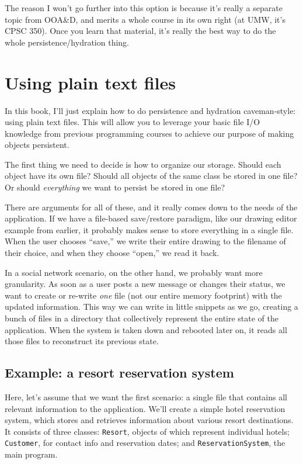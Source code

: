 The reason I won't go further into this option is because it's really a
separate topic from OOA\&D, and merits a whole course in its own right (at
UMW, it's CPSC 350). Once you learn that material, it's really the best way to
do the whole persistence/hydration thing.

\section{Using plain text files}

In this book, I'll just explain how to do persistence and hydration
caveman-style: using plain text files. This will allow you to leverage your
basic file I/O knowledge from previous programming courses to achieve our
purpose of making objects persistent.

The first thing we need to decide is how to organize our storage. Should each
object have its own file? Should all objects of the same class be stored in
one file? Or should \textit{everything} we want to persist be stored in one
file?

There are arguments for all of these, and it really comes down to the needs of
the application. If we have a file-based save/restore paradigm, like our
drawing editor example from earlier, it probably makes sense to store
everything in a single file. When the user chooses ``save,'' we write their
entire drawing to the filename of their choice, and when they choose ``open,''
we read it back.

In a social network scenario, on the other hand, we probably want more
granularity. As soon as a user posts a new message or changes their status, we
want to create or re-write \textit{one} file (not our entire memory footprint)
with the updated information. This way we can write in little snippets as we
go, creating a bunch of files in a directory that collectively represent the
entire state of the application. When the system is taken down and rebooted
later on, it reads all those files to reconstruct its previous state.

\subsection{Example: a resort reservation system}

Here, let's assume that we want the first scenario: a single file that
contains all relevant information to the application. We'll create a simple
hotel reservation system, which stores and retrieves information about various
resort destinations. It consists of three classes: \texttt{Resort}, objects of
which represent individual hotels; \texttt{Customer}, for contact info and
reservation dates; and \texttt{ReservationSystem}, the main program.

